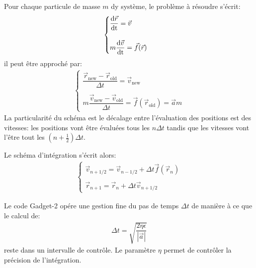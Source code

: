 			Pour chaque particule de masse $m$ dy système, le problème à résoudre s'écrit:
			\begin{align*}
				\begin{cases}
					\dfrac{\mathrm{d}\vec{r}}{\mathrm{dt}} = \vec{v} \\
					\\
					m\dfrac{\mathrm{d}\vec{v}}{\mathrm{dt}} = \vec{f}(\vec{r})
				\end{cases}
			\end{align*}
			il peut être approché par:
			\begin{align*}
				\begin{cases}
					\dfrac{\vec{r}_\mathrm{new} - \vec{r}_\mathrm{old}}{\Delta t} = \vec{v}_\mathrm{new} \\
					\\
					m\dfrac{\vec{v}_\mathrm{new} - \vec{v}_\mathrm{old}}{\Delta t} = \vec{f}(\vec{r}_\mathrm{old}) = \vec{a}m
				\end{cases}
			\end{align*}
			La particularité du schéma est le décalage entre l'évaluation des positions est des vitesses:
			les positions vont être évaluées tous les $n\Delta t$ tandis que les vitesses vont l'être tout
			les $(n+\frac{1}{2})\Delta t$.

			Le schéma d'intégration s'écrit alors:
			\begin{align*}
				\begin{cases}
					\vec{v}_{n+1/2} = \vec{v}_{n-1/2} + \Delta t\vec{f}(\vec{r}_n) \\
					\\
					\vec{r}_{n+1} = \vec{r}_n +\Delta t\vec{v}_{n+1/2}
				\end{cases}
			\end{align*}

			Le code Gadget-2 opére une gestion fine du pas de temps $\Delta t$ de manière à ce que le calcul
			de:
			\begin{align*}
				\Delta t = \sqrt{\dfrac{2\eta\epsilon}{|\vec{a}|}}
			\end{align*}
			reste dans un intervalle de contrôle.
			Le paramètre $\eta$ permet de contrôler la précision de l'intégration.

